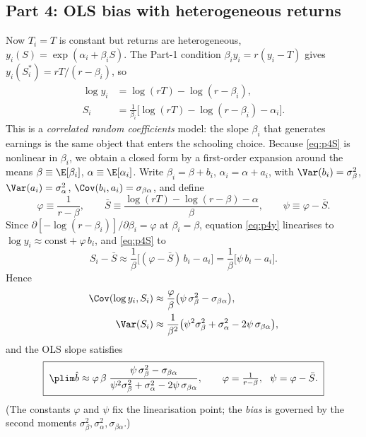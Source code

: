 \documentclass[11pt,english]{article}
\begin{document}
\subsection*{Part 4: OLS bias with heterogeneous returns}

Now $T_{i}=T$ is constant but returns are heterogeneous,
$y_{i}(S)=\exp(\alpha_{i}+\beta_{i}S)$. The Part-1 condition
$\beta_i y_i=r(y_i-T)$ gives $y_i(S_i^*)=rT/(r-\beta_i)$, so
\begin{align}
\log y_{i} &= \log(rT)-\log(r-\beta_{i}), \label{eq:p4y}\\
S_{i}      &= \frac{1}{\beta_{i}}\bigl[\log(rT)-\log(r-\beta_{i})-\alpha_{i}\bigr].
\label{eq:p4S}
\end{align}
This is a \emph{correlated random coefficients} model: the slope $\beta_i$ that
generates earnings is the same object that enters the schooling choice. Because
\eqref{eq:p4S} is nonlinear in $\beta_i$, we obtain a closed form by a
first-order expansion around the means $\beta\equiv\E[\beta_i]$,
$\alpha\equiv\E[\alpha_i]$. Write $\beta_i=\beta+b_i$, $\alpha_i=\alpha+a_i$,
with $\Var(b_i)=\sigma_\beta^2$, $\Var(a_i)=\sigma_\alpha^2$,
$\Cov(b_i,a_i)=\sigma_{\beta\alpha}$, and define
\[
\varphi\equiv\frac{1}{r-\beta},\qquad
\bar S\equiv\frac{\log(rT)-\log(r-\beta)-\alpha}{\beta},\qquad
\psi\equiv\varphi-\bar S .
\]
Since $\partial[-\log(r-\beta_i)]/\partial\beta_i=\varphi$ at $\beta_i=\beta$,
equation \eqref{eq:p4y} linearises to $\log y_i\approx\text{const}+\varphi\,b_i$,
and \eqref{eq:p4S} to
\[
S_i-\bar S\approx\frac{1}{\beta}\bigl[(\varphi-\bar S)\,b_i-a_i\bigr]
            =\frac{1}{\beta}\bigl[\psi\,b_i-a_i\bigr].
\]
Hence
\begin{align}
\Cov(\log y_i,S_i)&\approx\frac{\varphi}{\beta}\bigl(\psi\,\sigma_\beta^2-\sigma_{\beta\alpha}\bigr),\\
\Var(S_i)&\approx\frac{1}{\beta^2}\bigl(\psi^2\sigma_\beta^2+\sigma_\alpha^2-2\psi\,\sigma_{\beta\alpha}\bigr),
\end{align}
and the OLS slope satisfies
\begin{equation}\boxed{\;
\plim\hat{b}\approx\varphi\,\beta\;
\frac{\psi\,\sigma_\beta^2-\sigma_{\beta\alpha}}
{\psi^2\sigma_\beta^2+\sigma_\alpha^2-2\psi\,\sigma_{\beta\alpha}},
\qquad \varphi=\tfrac{1}{r-\beta},\ \ \psi=\varphi-\bar S.
\;}\end{equation}
(The constants $\varphi$ and $\psi$ fix the linearisation point; the
\emph{bias} is governed by the second moments
$\sigma_\beta^2,\sigma_\alpha^2,\sigma_{\beta\alpha}$.)
\end{document}
